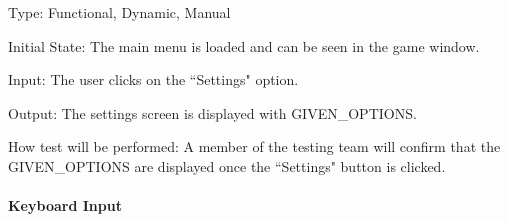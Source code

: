 \documentclass[12pt, titlepage]{article}
\begin{document}
\begin{enumerate}
Type: Functional, Dynamic, Manual
					
Initial State: The main menu is loaded and can be seen in the game window.
					
Input: The user clicks on the ``Settings" option.
					
Output: The settings screen is displayed with GIVEN\_OPTIONS.
					
How test will be performed: A member of the testing team will confirm that the GIVEN\_OPTIONS are displayed once the ``Settings" button is clicked.

\end{enumerate}		
\paragraph{Keyboard Input}
\end{document}

